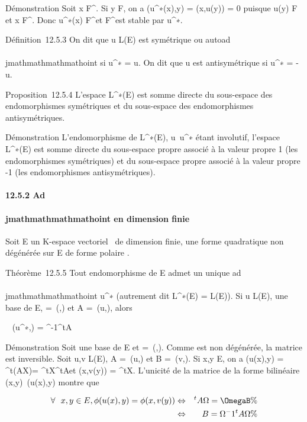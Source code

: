 Démonstration Soit x \in F^\bot. Si y \in F, on a
\phi(u^∗(x),y) = \phi(x,u(y)) = 0 puisque u(y) \in F et x \in
F^\bot. Donc u^∗(x) \in F^\bot et
F^\bot est stable par u^∗.

Définition~12.5.3 On dit que u \in L(E) est symétrique ou autoad\\\\jmathmathmathmathoint si
u^∗ = u. On dit que u est antisymétrique si u^∗ =
-u.

Proposition~12.5.4 L'espace L^∗(E) est somme directe du
sous-espace des endomorphismes symétriques et du sous-espace des
endomorphismes antisymétriques.

Démonstration L'endomorphisme de L^∗(E),
u\mapsto~u^∗ étant involutif, l'espace
L^∗(E) est somme directe du sous-espace propre associé à la
valeur propre 1 (les endomorphismes symétriques) et du sous-espace
propre associé à la valeur propre -1 (les endomorphismes
antisymétriques).

\paragraph{12.5.2 Ad\\\\jmathmathmathmathoint en dimension finie}

Soit E un K-espace vectoriel ~de dimension finie, \Phi une forme
quadratique non dégénérée sur E de forme polaire \phi.

Théorème~12.5.5 Tout endomorphisme de E admet un unique ad\\\\jmathmathmathmathoint
u^∗ (autrement dit L^∗(E) = L(E)). Si u \in L(E), 
une base de E, \Omega =\
\mathrmMat (\phi,) et A =\
\mathrmMat (u,), alors

\mathrmMat~
(u^∗,) = \Omega^-1^tA\Omega

Démonstration Soit \mathcal{E} une base de E et \Omega =\
\mathrmMat (\phi,). Comme \phi est non dégénérée, la
matrice \Omega est inversible. Soit u,v \in L(E), A =\
\mathrmMat (u,) et B =\
\mathrmMat (v,). Si x,y \in E, on a \phi(u(x),y) =
^t(AX)\OmegaY = ^tX^tA\OmegaY et \phi(x,v(y)) =
^tX\OmegaBY . L'unicité de la matrice de la forme bilinéaire
(x,y)\mapsto~\phi(u(x),y) montre que

\begin{align*} \forall~~x,y \in E,
\phi(u(x),y) = \phi(x,v(y))& \Leftrightarrow & ^tA\Omega
= \OmegaB \%& \\ &
\Leftrightarrow & B = \Omega^-1^tA\Omega\%&
\\ \end{align*}

